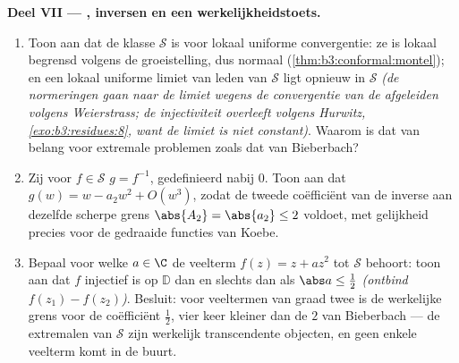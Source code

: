 \begin{problem}
\begin{enumerate}[resume]
\end{enumerate}
\medskip
\noindent\textbf{Deel VII --- , inversen en een
werkelijkheidstoets.}
\begin{enumerate}[resume]
  \item Toon aan dat de klasse $\mathcal S$ \emph{} is
        voor lokaal uniforme convergentie: ze is lokaal begrensd
        volgens de groeistelling, dus normaal
        (\cref{thm:b3:conformal:montel}); en een lokaal uniforme
        limiet van leden van $\mathcal S$ ligt opnieuw in
        $\mathcal S$ \emph{(de normeringen gaan naar de limiet
        wegens de convergentie van de afgeleiden volgens
        Weierstrass; de injectiviteit overleeft volgens Hurwitz,
        \cref{exo:b3:residues:8}, want de limiet is niet
        constant)}. Waarom is dat van belang voor extremale
        problemen zoals dat van Bieberbach?
  \item Zij voor $f \in \mathcal S$ $g = f^{-1}$, gedefinieerd
        nabij $0$. Toon aan dat $g(w) = w - a_2w^2 + O(w^3)$,
        zodat de tweede coëfficiënt van de inverse aan dezelfde
        scherpe grens $\abs{A_2} = \abs{a_2} \leq 2$ voldoet, met
        gelijkheid precies voor de gedraaide functies van Koebe.
  \item Bepaal voor welke $a \in \C$ de veelterm $f(z) = z + az^2$
        tot $\mathcal S$ behoort: toon aan dat $f$ injectief is
        op $\mathbb D$ dan en slechts dan als $\abs a \leq
        \frac12$ \emph{(ontbind $f(z_1) - f(z_2)$)}. Besluit:
        voor veeltermen van graad twee is de werkelijke grens
        voor de coëfficiënt $\frac12$, vier keer kleiner dan de
        $2$ van Bieberbach --- de extremalen van $\mathcal S$
        zijn werkelijk transcendente objecten, en geen enkele
        veelterm komt in de buurt.
\end{enumerate}
\end{problem}
